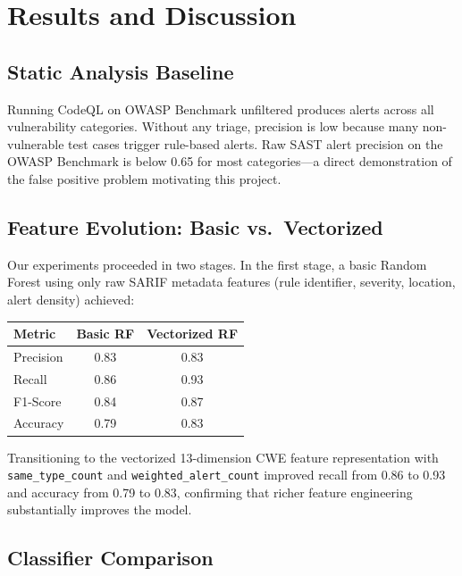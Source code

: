 \chapter{Results and Discussion}
\label{ch:results}

\section{Static Analysis Baseline}

Running CodeQL on OWASP Benchmark unfiltered produces alerts across all vulnerability
categories. Without any triage, precision is low because many non-vulnerable test cases
trigger rule-based alerts. Raw SAST alert precision on the OWASP Benchmark is below
0.65 for most categories---a direct demonstration of the false positive problem
motivating this project.

\section{Feature Evolution: Basic vs.\ Vectorized}

Our experiments proceeded in two stages. In the first stage, a basic Random Forest using
only raw SARIF metadata features (rule identifier, severity, location, alert density)
achieved:

\begin{center}
\begin{tabular}{lcc}
  \toprule
  \textbf{Metric} & \textbf{Basic RF} & \textbf{Vectorized RF} \\
  \midrule
  Precision & 0.83 & 0.83 \\
  Recall    & 0.86 & 0.93 \\
  F1-Score  & 0.84 & 0.87 \\
  Accuracy  & 0.79 & 0.83 \\
  \bottomrule
\end{tabular}
\end{center}

Transitioning to the vectorized 13-dimension CWE feature representation with
\texttt{same\_type\_count} and \texttt{weighted\_alert\_count} improved recall from
0.86 to 0.93 and accuracy from 0.79 to 0.83, confirming that richer feature
engineering substantially improves the model.

\section{Classifier Comparison}

